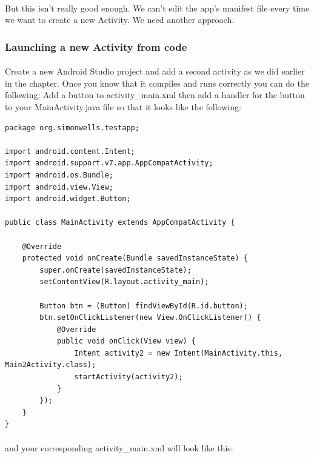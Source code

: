 \paragraph{} But this isn't really good enough. We can't edit the app's manifest file every time we want to create a new Activity. We need another approach.

\subsubsection{Launching a new Activity from code}
\paragraph{} Create a new Android Studio project and add a second activity as we did earlier in the chapter. Once you know that it compiles and runs correctly you can do the following: Add a button to activity\_main.xml then add a handler for the button to your MainActivity.java file so that it looks like the following:

\begin{lstlisting}
package org.simonwells.testapp;

import android.content.Intent;
import android.support.v7.app.AppCompatActivity;
import android.os.Bundle;
import android.view.View;
import android.widget.Button;

public class MainActivity extends AppCompatActivity {

    @Override
    protected void onCreate(Bundle savedInstanceState) {
        super.onCreate(savedInstanceState);
        setContentView(R.layout.activity_main);

        Button btn = (Button) findViewById(R.id.button);
        btn.setOnClickListener(new View.OnClickListener() {
            @Override
            public void onClick(View view) {
                Intent activity2 = new Intent(MainActivity.this, Main2Activity.class);
                startActivity(activity2);
            }
        });
    }
}
\end{lstlisting}

\paragraph{} and your corresponding activity\_main.xml will look like this:

